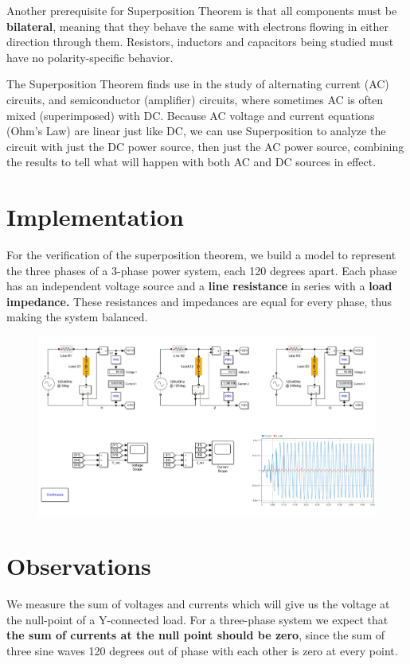 \documentclass[a4paper,12pt]{article}
\begin{document}
    Another prerequisite for Superposition Theorem is that all components must be 
    {\bf bilateral}, meaning that they behave the same with electrons flowing in either 
    direction through them. Resistors, inductors and capacitors being studied must 
    have no polarity-specific behavior.

    The Superposition Theorem finds use in the study of alternating current (AC) 
    circuits, and semiconductor (amplifier) circuits, where sometimes AC is often 
    mixed (superimposed) with DC. Because AC voltage and current equations (Ohm’s Law) 
    are linear just like DC, we can use Superposition to analyze the circuit with 
    just the DC power source, then just the AC power source, combining the results 
    to tell what will happen with both AC and DC sources in effect.

  \pagebreak
  \section{Implementation}
  For the verification of the superposition theorem, we build a model to represent
  the three phases of a 3-phase power system, each 120 degrees apart.
  Each phase has an independent voltage source and a {\bf line resistance} in series 
  with a {\bf load impedance.} These resistances and impedances are equal for every
  phase, thus making the system balanced.
  \begin{figure}[H]
    \centering
    \includegraphics[width=6in]{img/model.png}
  \end{figure}

  \section{Observations}
  We measure the sum of voltages and currents which will give us the voltage at the
  null-point of a Y-connected load. For a three-phase system we expect that {\bf the sum
  of currents at the null point should be zero}, since the sum of three sine waves
  120 degrees out of phase with each other is zero at every point.
\end{document}
